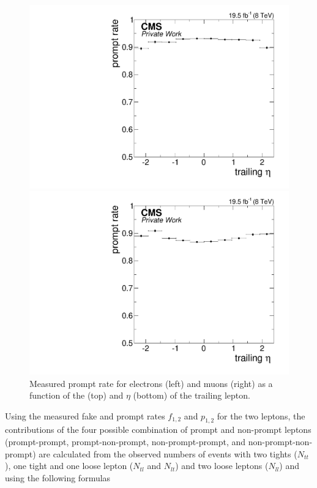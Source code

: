 \begin{figure}[htbp]
\begin{minipage}[t]{0.49\textwidth}
\includegraphics[width=\textwidth]{plots/BG/nonPrompt/promptRate_ele_Inclusive_Full2012_TrailingEta_None.pdf}
\end{minipage}
\begin{minipage}[t]{0.49\textwidth}
\includegraphics[width=\textwidth]{plots/BG/nonPrompt/promptRate_mu_Inclusive_Full2012_TrailingEta_None.pdf}
\end{minipage}
\caption{Measured prompt rate for electrons (left) and muons (right) as a function of the \pt (top) and $\eta$ (bottom) of the trailing lepton.}


\label{fig:promptRate}
\end{figure} 
Using the measured fake and prompt rates $f_{1,2}$ and $p_{1,2}$ for the two leptons, the contributions of the four possible combination of prompt and non-prompt leptons (prompt-prompt, prompt-non-prompt, non-prompt-prompt, and non-prompt-non-prompt) are calculated from the observed numbers of events with two tights ($N_{tt}$), one tight and one loose lepton ($N_{tl}$ and $N_{lt}$) and two loose leptons ($N_{ll}$)  and  using the following formulas
